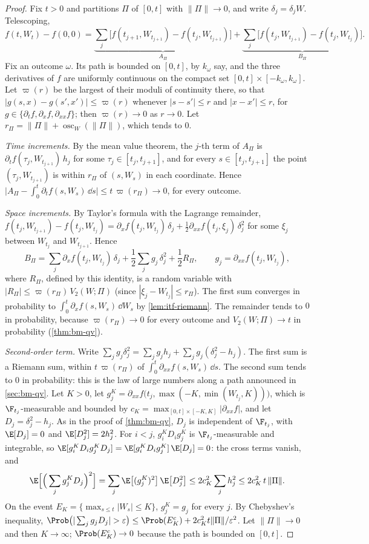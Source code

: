 \begin{proof}
Fix $t>0$ and partitions $\Pi$ of $[0,t]$ with $\|\Pi\|\to0$, and write $\delta_j=\delta_jW$.
Telescoping,
\[
  f(t,W_t)-f(0,0)=\underbrace{\sum_j\big[f(t_{j+1},W_{t_{j+1}})-f(t_j,W_{t_{j+1}})\big]}_{A_\Pi}
  +\underbrace{\sum_j\big[f(t_j,W_{t_{j+1}})-f(t_j,W_{t_j})\big]}_{B_\Pi}.
\]
Fix an outcome $\omega$. Its path is bounded on $[0,t]$, by $k_\omega$ say, and the three
derivatives of $f$ are uniformly continuous on the compact set $[0,t]\times[-k_\omega,k_\omega]$.
Let $\varpi(r)$ be the largest of their moduli of continuity there, so that
$|g(s,x)-g(s',x')|\le\varpi(r)$ whenever $|s-s'|\le r$ and $|x-x'|\le r$, for
$g\in\{\partial_tf,\partial_xf,\partial_{xx}f\}$; then $\varpi(r)\to0$ as $r\to0$. Let
$r_\Pi=\|\Pi\|+\operatorname{osc}_W(\|\Pi\|)$, which tends to $0$.

\emph{Time increments.} By the mean value theorem, the $j$-th term of $A_\Pi$ is
$\partial_tf(\tau_j,W_{t_{j+1}})\,h_j$ for some $\tau_j\in[t_j,t_{j+1}]$, and for every
$s\in[t_j,t_{j+1}]$ the point $(\tau_j,W_{t_{j+1}})$ is within $r_\Pi$ of $(s,W_s)$ in each
coordinate. Hence $\big|A_\Pi-\int_0^t\partial_tf(s,W_s)\,\dd s\big|\le t\,\varpi(r_\Pi)\to0$, for
every outcome.

\emph{Space increments.} By Taylor's formula with the Lagrange remainder,
$f(t_j,W_{t_{j+1}})-f(t_j,W_{t_j})=\partial_xf(t_j,W_{t_j})\,\delta_j+\frac12\partial_{xx}f(t_j,\xi_j)\,\delta_j^2$
for some $\xi_j$ between $W_{t_j}$ and $W_{t_{j+1}}$. Hence
\[
  B_\Pi=\sum_j\partial_xf(t_j,W_{t_j})\,\delta_j+\frac12\sum_jg_j\,\delta_j^2+\frac12R_\Pi,
  \qquad g_j=\partial_{xx}f(t_j,W_{t_j}),
\]
where $R_\Pi$, defined by this identity, is a random variable with
$|R_\Pi|\le\varpi(r_\Pi)\,V_2(W;\Pi)$ (since $|\xi_j-W_{t_j}|\le r_\Pi$). The first sum converges in
probability to $\int_0^t\partial_xf(s,W_s)\,\dd W_s$ by \cref{lem:itf-riemann}. The remainder
tends to $0$ in probability, because $\varpi(r_\Pi)\to0$ for every outcome and
$V_2(W;\Pi)\to t$ in probability (\cref{thm:bm-qv}).

\emph{Second-order term.} Write $\sum_jg_j\delta_j^2=\sum_jg_jh_j+\sum_jg_j(\delta_j^2-h_j)$.
The first sum is a Riemann sum, within $t\,\varpi(r_\Pi)$ of
$\int_0^t\partial_{xx}f(s,W_s)\,\dd s$. The second sum tends to $0$ in probability: this is the
law of large numbers along a path announced in \cref{sec:bm-qv}. Let $K>0$, let
$g^K_j=\partial_{xx}f\big(t_j,\max(-K,\min(W_{t_j},K))\big)$, which is $\F_{t_j}$-measurable and
bounded by $c_K=\max_{[0,t]\times[-K,K]}|\partial_{xx}f|$, and let $D_j=\delta_j^2-h_j$. As in the
proof of \cref{thm:bm-qv}, $D_j$ is independent of $\F_{t_j}$, with $\E[D_j]=0$ and
$\E[D_j^2]=2h_j^2$. For $i<j$, $g^K_iD_ig^K_j$ is $\F_{t_j}$-measurable and integrable, so
$\E[g^K_iD_ig^K_jD_j]=\E[g^K_iD_ig^K_j]\,\E[D_j]=0$: the cross terms vanish, and
\[
  \E\Big[\Big(\sum_jg^K_jD_j\Big)^2\Big]=\sum_j\E\big[(g^K_j)^2\big]\,\E\big[D_j^2\big]\le2c_K^2\sum_jh_j^2\le2c_K^2\,t\,\|\Pi\| .
\]
On the event $E_K=\{\max_{s\le t}|W_s|\le K\}$, $g^K_j=g_j$ for every $j$. By Chebyshev's
inequality,
$\Prob\big(|\sum_jg_jD_j|>\varepsilon\big)\le\Prob(E_K^c)+2c_K^2t\|\Pi\|/\varepsilon^2$. Let
$\|\Pi\|\to0$ and then $K\to\infty$; $\Prob(E_K^c)\to0$ because the path is bounded on $[0,t]$.


\end{proof}
